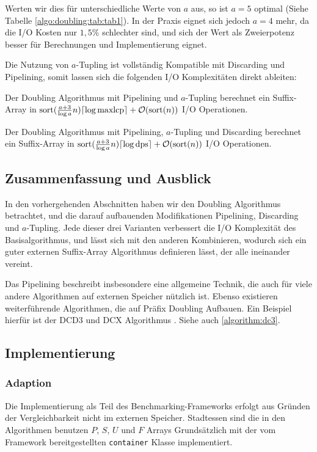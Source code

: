 Werten wir dies für unterschiedliche Werte von $a$ aus, so ist $a = 5$ optimal (Siehe Tabelle \ref{algo:doubling:tab:tab1}). In der Praxis eignet sich jedoch $a = 4$ mehr, da die I/O Kosten nur $1,5\%$ schlechter sind, und sich der Wert als Zweierpotenz besser für Berechnungen und Implementierung eignet.

Die Nutzung von $a$-Tupling ist vollständig Kompatible mit Discarding und Pipelining, somit lassen sich die folgenden I/O Komplexitäten direkt ableiten:

\begin{theorem}
Der Doubling Algorithmus mit Pipelining und $a$-Tupling berechnet ein Suffix-Array in $\text{sort}(\frac{a + 3}{\log a}n) \ceil*{\log \text{maxlcp}} +  \mathcal{O}(\text{sort}(n))$ I/O Operationen.
\end{theorem}

\begin{theorem}
Der Doubling Algorithmus mit Pipelining, $a$-Tupling und Discarding berechnet ein Suffix-Array in $\text{sort}(\frac{a + 3}{\log a}n) \ceil*{\log \text{dps}} +  \mathcal{O}(\text{sort}(n))$ I/O Operationen.
\end{theorem}

\subsection{Zusammenfassung und Ausblick}
\label{algo:doubling:sec:summary}

In den vorhergehenden Abschnitten haben wir den Doubling Algorithmus betrachtet, und die darauf aufbauenden Modifikationen Pipelining, Discarding und $a$-Tupling. Jede dieser drei Varianten verbessert die I/O Komplexität des Basisalgorithmus, und lässt sich mit den anderen Kombinieren, wodurch sich ein guter externen Suffix-Array Algorithmus definieren lässt, der alle ineinander vereint.

Das Pipelining beschreibt insbesondere eine allgemeine Technik, die auch für viele andere Algorithmen auf externen Speicher nützlich ist. Ebenso existieren weiterführende Algorithmen, die auf Präfix Doubling Aufbauen. Ein Beispiel hierfür ist der DCD3 und DCX Algorithmus \cite{saca:11}. Siehe auch \cref{algorithm:dc3}.

\subsection{Implementierung}
\subsubsection{Adaption}
Die Implementierung als Teil des Benchmarking-Frameworks erfolgt aus Gründen der Vergleichbarkeit nicht im externen Speicher. Stadtessen sind die in den Algorithmen benutzen $P$, $S$, $U$ und $F$ Arrays Grundsätzlich mit der vom Framework bereitgestellten \texttt{container} Klasse implementiert.

